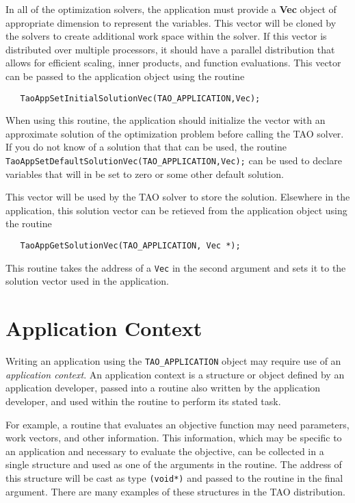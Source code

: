 In all of the optimization solvers, the application must provide
a {\bf Vec} object of appropriate dimension to represent the variables.
This vector will be cloned by the solvers to create additional work
space within the solver.
If this vector is distributed over multiple processors, it
should have a parallel distribution that allows
for efficient scaling, inner products, and
function evaluations.  This vector can be passed to the
application object using the routine 
\begin{verbatim}
   TaoAppSetInitialSolutionVec(TAO_APPLICATION,Vec);
\end{verbatim}
When using this routine, the application should initialize the vector with
an approximate solution of the optimization problem before calling the
TAO solver.   If you do not know of a solution that that can be used,
the routine
{\tt   TaoAppSetDefaultSolutionVec(TAO\_APPLICATION,Vec);}
can be used to declare variables that will in
be set to zero or some other default solution.  

This vector will be used by the TAO solver to store the solution.
Elsewhere in the application, 
this solution vector can be retieved from the application object 
using the routine 
\begin{verbatim}
   TaoAppGetSolutionVec(TAO_APPLICATION, Vec *);
\end{verbatim}
This routine takes the address of a {\tt Vec} in the second argument and sets it to
the solution vector used in the application.

\section{Application Context}  
Writing an application using the {\tt TAO\_APPLICATION} object may require
use of an {\em application context}.
An application context is a structure or object defined by an
application developer, passed
into a routine also written by the application developer, 
and used within the routine to perform its stated task.
 
For example, a routine that evaluates an objective function may need
parameters, work vectors, and other information.   This information,
which may be specific to an application and necessary to evaluate the objective,
can be collected in a single structure and used as one of the
arguments in the routine.
The address of this structure will be cast as type {\tt (void*)} and passed to
the routine in the final argument.
There are many examples of these structures in the TAO distribution.

